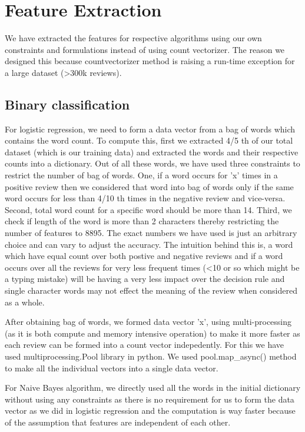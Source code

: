 \documentclass{article}
\begin{document}
\section{Feature Extraction}

We have extracted the features for respective algorithms using our own constraints and formulations instead of using count vectorizer. The reason we designed this because countvectorizer method is raising a run-time exception for a large dataset (\textgreater300k reviews).

\subsection{Binary classification}
For logistic regression, we need to form a data vector from a bag of words which contains the word count. To compute this, first we extracted 4/5 th of our total dataset (which is our training data) and extracted the words and their respective counts into a dictionary. Out of all these words, we have used three constraints to restrict the number of bag of words. One, if a word occurs for 'x' times in a positive review then we considered that word into bag of words only if the same word occurs for less than 4/10 th times in the negative review and vice-versa. Second, total word count for a specific word should be more than 14. Third, we check if length of the word is more than 2 characters thereby restricting the number of features to 8895. The exact numbers we have used is just an arbitrary choice and can vary to adjust the accuracy. The intuition behind this is, a word which have equal count over both postive and negative reviews and if a word occurs over all the reviews for very less frequent times (\textless10 or so which might be a typing mistake) will be having a very less impact over the decision rule and single character words may not effect the meaning of the review when considered as a whole.

After obtaining bag of words, we formed data vector 'x', using multi-processing (as it is both compute and memory intensive operation) to make it more faster as each review can be formed into a count vector indepedently. For this we have used multiprocessing.Pool library in python. We used pool.map\_async() method to make all the individual vectors into a single data vector. 

For Naive Bayes algorithm, we directly used all the words in the initial dictionary without using any constraints as there is no requirement for us to form the data vector as we did in logistic regression and the computation is way faster because of the assumption that features are independent of each other. 
\end{document}
